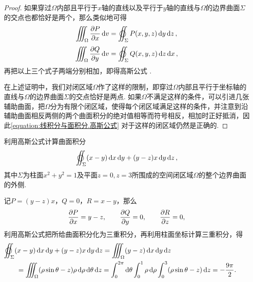 \begin{theorem}
\begin{proof}
如果穿过\(\Omega\)内部且平行于\(x\)轴的直线以及平行于\(y\)轴的直线与\(\Omega\)的边界曲面\(\Sigma\)的交点也都恰好是两个，那么类似地可得\[
\iiint_{\Omega} \pdv{P}{x} \dd{v} = \varoiint_\Sigma P(x,y,z) \dd{y}\dd{z},
\]\[
\iiint_{\Omega} \pdv{Q}{y} \dd{v} = \varoiint_\Sigma Q(x,y,z) \dd{z}\dd{x},
\]再把以上三个式子两端分别相加，即得高斯公式 .

在上述证明中，我们对闭区域\(\Omega\)作了这样的限制，即穿过\(\Omega\)内部且平行于坐标轴的直线与\(\Omega\)的边界曲面\(\Sigma\)的交点恰好是两点.
如果\(\Omega\)不满足这样的条件，可以引进几张辅助曲面，把\(\Omega\)分为有限个闭区域，使得每个闭区域满足这样的条件，并注意到沿辅助曲面相反两侧的两个曲面积分的绝对值相等而符号相反，相加时正好抵消，因此\cref{equation:线积分与面积分.高斯公式} 对于这样的闭区域仍然是正确的.
\end{proof}
\end{theorem}


\begin{example}
利用高斯公式计算曲面积分\[
\varoiint_\Sigma (x-y) \dd{x}\dd{y} + (y-z)x \dd{y}\dd{z},
\]其中\(\Sigma\)为柱面\(x^2+y^2=1\)及平面\(z=0,z=3\)所围成的空间闭区域\(\Omega\)的整个边界曲面的外侧.
\begin{solution}
记\(P=(y-z)x\)，\(Q=0\)，\(R=x-y\)，那么\[
\pdv{P}{x} = y-z,
\qquad
\pdv{Q}{y} = 0,
\qquad
\pdv{R}{z} = 0,
\]利用高斯公式把所给曲面积分化为三重积分，再利用柱面坐标计算三重积分，得\begin{align*}
&\hspace{-20pt}\varoiint_\Sigma (x-y) \dd{x}\dd{y} + (y-z)x \dd{y}\dd{z}
= \iiint_{\Omega} (y-z) \dd{x}\dd{y}\dd{z} \\
&= \iiint_{\Omega} (\rho\sin\theta-z)\rho\dd{\rho}\dd{\theta}\dd{z}
= \int_0^{2\pi} \dd{\theta} \int_0^1 \rho\dd{\rho} \int_0^3 (\rho\sin\theta-z) \dd{z}
= -\frac{9\pi}{2}.
\end{align*}
\end{solution}
\end{example}

